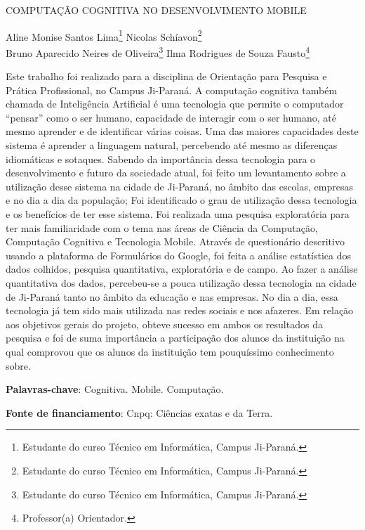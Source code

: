 \documentclass[article,12pt,onesidea,4paper,english,brazil]{abntex2}
\begin{document}
	
	
	\frenchspacing 
	
	\begin{center}
		\LARGE COMPUTAÇÃO COGNITIVA NO DESENVOLVIMENTO MOBILE
		
		\normalsize
	Aline Monise Santos Lima\footnote{Estudante do curso Técnico em Informática, Campus Ji-Paraná.} 
		Nicolas Schíavon\footnote{Estudante do curso Técnico em Informática, Campus Ji-Paraná.} \\
		Bruno Aparecido Neires de Oliveira\footnote{Estudante do curso Técnico em Informática, Campus Ji-Paraná.} 
		Ilma Rodrigues de Souza Fausto\footnote{Professor(a) Orientador.} 
	\end{center}
	
	\noindent
	Este trabalho foi realizado para a disciplina de Orientação para Pesquisa e Prática
	Profissional, no Campus Ji-Paraná. A computação cognitiva também chamada de
	Inteligência Artificial é uma tecnologia que permite o computador “pensar” como o
	ser humano, capacidade de interagir com o ser humano, até mesmo aprender e de
	identificar várias coisas. Uma das maiores capacidades deste sistema é aprender a
	linguagem natural, percebendo até mesmo as diferenças idiomáticas e sotaques.
	Sabendo da importância dessa tecnologia para o desenvolvimento e futuro da
	sociedade atual, foi feito um levantamento sobre a utilização desse sistema na
	cidade de Ji-Paraná, no âmbito das escolas, empresas e no dia a dia da população;
	Foi identificado o grau de utilização dessa tecnologia e os benefícios de ter esse
	sistema. Foi realizada uma pesquisa exploratória para ter mais familiaridade com o
	tema nas áreas de Ciência da Computação, Computação Cognitiva e Tecnologia
	Mobile. Através de questionário descritivo usando a plataforma de Formulários do
	Google, foi feita a análise estatística dos dados colhidos, pesquisa quantitativa,
	exploratória e de campo. Ao fazer a análise quantitativa dos dados, percebeu-se a
	pouca utilização dessa tecnologia na cidade de Ji-Paraná tanto no âmbito da
	educação e nas empresas. No dia a dia, essa tecnologia já tem sido mais utilizada
	nas redes sociais e nos afazeres. Em relação aos objetivos gerais do projeto, obteve
	sucesso em ambos os resultados da pesquisa e foi de suma importância a
	participação dos alunos da instituição na qual comprovou que os alunos da
	instituição tem pouquíssimo conhecimento sobre.
	
	\vspace{\onelineskip}
	
	\noindent
	\textbf{Palavras-chave}: Cognitiva. Mobile. Computação. 
	
	\noindent
	\textbf{Fonte de financiamento}: Cnpq: Ciências exatas e da Terra.
	
\end{document}
